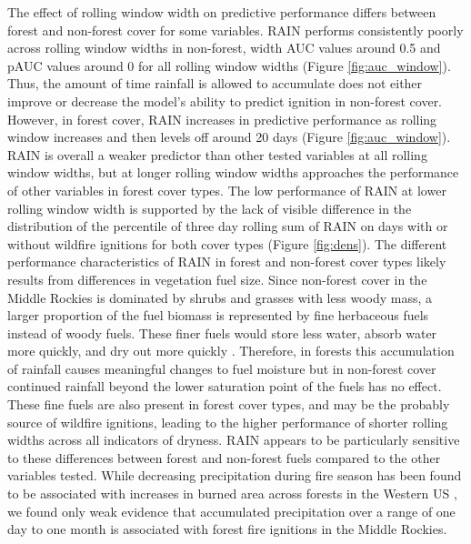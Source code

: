 \documentclass[11p]{article}
\begin{document}
The effect of rolling window width on predictive performance differs between forest and non-forest cover for some variables. RAIN performs consistently poorly across rolling window widths in non-forest, width AUC values around 0.5 and pAUC values around 0 for all rolling window widths (Figure \ref{fig:auc_window}). Thus, the amount of time rainfall is allowed to accumulate does not either improve or decrease the model's ability to predict ignition in non-forest cover. However, in forest cover, RAIN increases in predictive performance as rolling window increases and then levels off around 20 days (Figure \ref{fig:auc_window}). RAIN is overall a weaker predictor than other tested variables at all rolling window widths, but at longer rolling window widths approaches the performance of other variables in forest cover types. The low performance of RAIN at lower rolling window width is supported by the lack of visible difference in the distribution of the percentile of three day rolling sum of RAIN on days with or without wildfire ignitions for both cover types (Figure \ref{fig:dens}). The different performance characteristics of RAIN in forest and non-forest cover types likely results from differences in vegetation fuel size. Since non-forest cover in the Middle Rockies is dominated by shrubs and grasses with less woody mass, a larger proportion of the fuel biomass is represented by fine herbaceous fuels instead of woody fuels. These finer fuels would store less water, absorb water more quickly, and dry out more quickly \citep{vineyReviewFineFuel1991}. Therefore, in forests this accumulation of rainfall causes meaningful changes to fuel moisture but in non-forest cover continued rainfall beyond the lower saturation point of the fuels has no effect. These fine fuels are also present in forest cover types, and may be the probably source of wildfire ignitions, leading to the higher performance of shorter rolling widths across all indicators of dryness. RAIN appears to be particularly sensitive to these differences between forest and non-forest fuels compared to the other variables tested. While decreasing precipitation during fire season has been found to be associated with increases in burned area across forests in the Western US \citep{holdenDecreasingFireSeason2018}, we found only weak evidence that accumulated precipitation over a range of one day to one month is associated with forest fire ignitions in the Middle Rockies.
\end{document}
